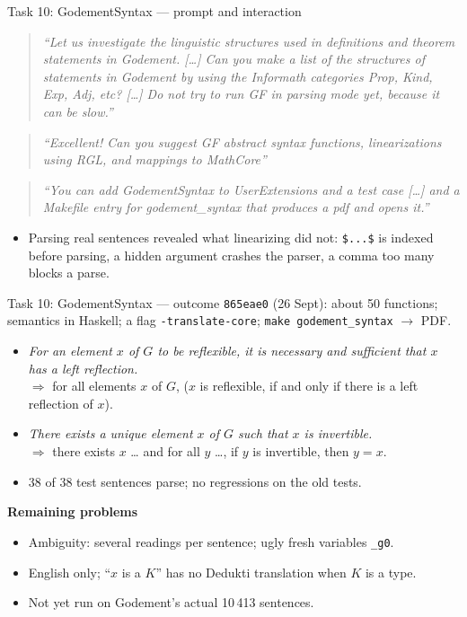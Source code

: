 \documentclass[10pt,aspectratio=169]{beamer}
\newcommand{\commit}[1]{\texttt{\footnotesize #1}}
\newcommand{\prompt}[1]{\begin{quote}\small\itshape ``#1''\end{quote}}
\begin{document}
\begin{frame}{Task 10: GodementSyntax --- prompt and interaction}
  \prompt{Let us investigate the linguistic structures used in definitions and
    theorem statements in Godement. [\dots] Can you make a list of the structures
    of statements in Godement by using the Informath categories Prop, Kind, Exp,
    Adj, etc? [\dots] Do not try to run GF in parsing mode yet, because it can be slow.}
  \prompt{Excellent! Can you suggest GF abstract syntax functions,
    linearizations using RGL, and mappings to MathCore}
  \prompt{You can add GodementSyntax to UserExtensions and a test case [\dots]
    and a Makefile entry for godement\_syntax that produces a pdf and opens it.}
  \begin{itemize}\small
    \item Parsing real sentences revealed what linearizing did not:
          \texttt{\$...\$} is indexed before parsing, a hidden argument crashes the
          parser, a comma too many blocks a parse.
  \end{itemize}
\end{frame}

\begin{frame}{Task 10: GodementSyntax --- outcome}
  \commit{865eae0} (26 Sept): about 50 functions; semantics in Haskell;
  a flag \texttt{-translate-core}; \texttt{make godement\_syntax} $\to$ PDF.
  \begin{itemize}\small
    \item \emph{For an element $x$ of $G$ to be reflexible, it is necessary and
          sufficient that $x$ has a left reflection.}\\
          $\Rightarrow$ for all elements $x$ of $G$, ($x$ is reflexible, if and only if
          there is a left reflection of $x$).
    \item \emph{There exists a unique element $x$ of $G$ such that $x$ is invertible.}\\
          $\Rightarrow$ there exists $x$ \dots{} and for all $y$ \dots, if $y$ is
          invertible, then $y = x$.
    \item 38 of 38 test sentences parse; no regressions on the old tests.
  \end{itemize}
  \textbf{Remaining problems}
  \begin{itemize}\small
    \item Ambiguity: several readings per sentence; ugly fresh variables \texttt{\_g0}.
    \item English only; ``$x$ is a $K$'' has no Dedukti translation when $K$ is a type.
    \item Not yet run on Godement's actual 10\,413 sentences.
  \end{itemize}
\end{frame}
\end{document}
